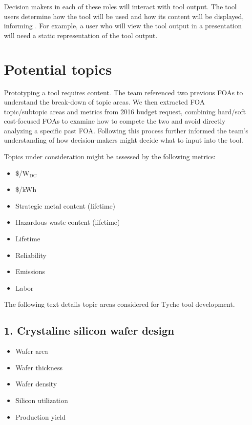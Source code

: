\documentclass[letterpaper,10pt,english]{sphinxmanual}
\begin{document}
Decision makers in each of these roles will interact with tool output.
The tool users determine how the tool will be used and how its content
will be displayed, informing .
For example, a user who will view the tool output in a presentation will
need a static representation of the tool output.


\section{Potential topics}
\label{\detokenize{doc-src/mock-foa:potential-topics}}
Prototyping a tool requires content. The team referenced two previous
FOAs to understand the break-down of topic areas. We then extracted FOA
topic/subtopic areas and metrics from 2016 budget request, combining
hard/soft cost-focused FOAs to examine how to compete the two and avoid
directly analyzing a specific past FOA. Following this process further
informed the team’s understanding of how decision-makers might decide
what to input into the tool.

Topics under consideration might be assessed by the following metrics:
\begin{itemize}
\item {} 
\$/W$_{\text{DC}}$

\item {} 
\$/kWh

\item {} 
Strategic metal content (lifetime)

\item {} 
Hazardous waste content (lifetime)

\item {} 
Lifetime

\item {} 
Reliability

\item {} 
Emissions

\item {} 
Labor

\end{itemize}

The following text details topic areas considered for Tyche tool
development.


\subsection{1. Crystaline silicon wafer design}
\label{\detokenize{doc-src/mock-foa:crystaline-silicon-wafer-design}}\begin{itemize}
\item {} 
Wafer area

\item {} 
Wafer thickness

\item {} 
Wafer density

\item {} 
Silicon utilization

\item {} 
Production yield

\end{itemize}
\end{document}
